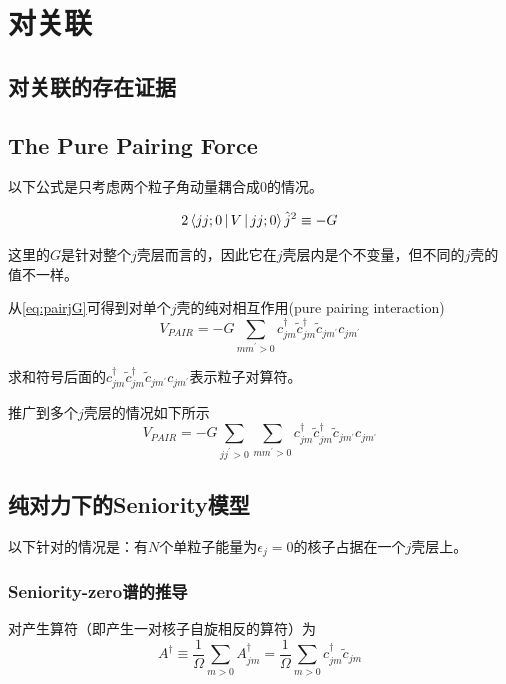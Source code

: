 \chapter{对关联}

\section{对关联的存在证据}

\section{The Pure Pairing Force}

以下公式是只考虑两个粒子角动量耦合成0的情况。

\begin{equation}
    2\Braket{jj; 0 | V | jj;0}\hat{j}^2 \equiv -G
    \label{eq:pairjG}
\end{equation}
\begin{note}
    这里的$G$是针对整个$j$壳层而言的，因此它在$j$壳层内是个不变量，但不同的$j$壳的值不一样。
\end{note}
从\cref{eq:pairjG}可得到对单个$j$壳的纯对相互作用(pure pairing interaction)
\begin{equation}\boxed{
    V_{PAIR} = -G \sum_{m m^{\prime}>0} c^{\dagger}_{jm}\tilde{c}^{\dagger}_{jm} \tilde{c}_{jm^{\prime}}c_{jm^{\prime}}
    \label{eq:pairV}
}\end{equation}
\begin{note}
    求和符号后面的$c^{\dagger}_{jm}\tilde{c}^{\dagger}_{jm} \tilde{c}_{jm^{\prime}}c_{jm^{\prime}}$表示粒子对算符。
\end{note}

推广到多个$j$壳层的情况如下所示
\begin{equation}\boxed{
    V_{PAIR} = -G \sum_{j j^{\prime}>0} \sum_{m m^{\prime}>0} c^{\dagger}_{jm}\tilde{c}^{\dagger}_{jm} \tilde{c}_{jm^{\prime}}c_{jm^{\prime}}
}\end{equation}

\section{纯对力下的Seniority模型}
以下针对的情况是：有$N$个单粒子能量为$\epsilon_j = 0$的核子占据在一个$j$壳层上。

\subsection{Seniority-zero谱的推导}
对产生算符（即产生一对核子自旋相反的算符）为
\begin{equation}
    A^{\dagger} \equiv \frac{1}{\Omega} \sum_{m > 0} A^{\dagger}_{jm} = \frac{1}{\Omega} \sum_{m > 0} c^{\dagger}_{jm} \tilde{c}_{jm}
\end{equation}

